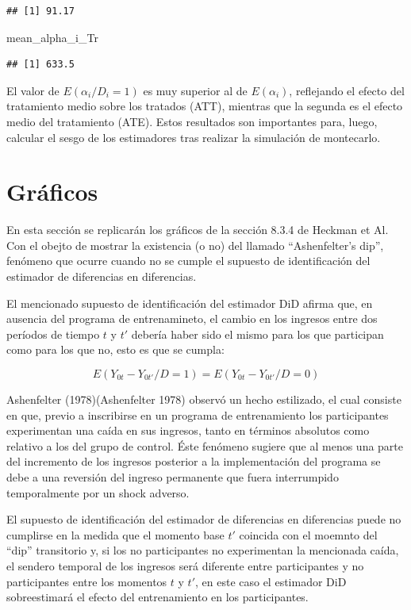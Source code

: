 \documentclass[]{article}
\newenvironment{Shaded}{\begin{snugshade}}{\end{snugshade}}
\newcommand{\NormalTok}[1]{{#1}}
\begin{document}
\begin{verbatim}
## [1] 91.17
\end{verbatim}

\begin{Shaded}
\begin{Highlighting}[]
\NormalTok{mean_alpha_i_Tr}
\end{Highlighting}
\end{Shaded}

\begin{verbatim}
## [1] 633.5
\end{verbatim}

El valor de $E(\alpha_{i}/D_{i}=1)$ es muy superior al de
$E(\alpha_{i})$, reflejando el efecto del tratamiento medio sobre los
tratados (ATT), mientras que la segunda es el efecto medio del
tratamiento (ATE). Estos resultados son importantes para, luego,
calcular el sesgo de los estimadores tras realizar la simulación de
montecarlo.

\section{Gráficos}\label{graficos}

En esta sección se replicarán los gráficos de la sección 8.3.4 de
Heckman et Al. Con el obejto de mostrar la existencia (o no) del llamado
``Ashenfelter's dip'', fenómeno que ocurre cuando no se cumple el
supuesto de identificación del estimador de diferencias en diferencias.

El mencionado supuesto de identificación del estimador DiD afirma que,
en ausencia del programa de entrenamineto, el cambio en los ingresos
entre dos períodos de tiempo $t$ y $t'$ debería haber sido el mismo para
los que participan como para los que no, esto es que se cumpla:

\[ E(Y_{0t}-Y_{0t'}/D=1)=E(Y_{0t}-Y_{0t'}/D=0) \]

Ashenfelter (1978)(Ashenfelter 1978) observó un hecho estilizado, el
cual consiste en que, previo a inscribirse en un programa de
entrenamiento los participantes experimentan una caída en sus ingresos,
tanto en términos absolutos como relativo a los del grupo de control.
Éste fenómeno sugiere que al menos una parte del incremento de los
ingresos posterior a la implementación del programa se debe a una
reversión del ingreso permanente que fuera interrumpido temporalmente
por un shock adverso.

El supuesto de identificación del estimador de diferencias en
diferencias puede no cumplirse en la medida que el momento base $t'$
coincida con el moemnto del ``dip'' transitorio y, si los no
participantes no experimentan la mencionada caída, el sendero temporal
de los ingresos será diferente entre participantes y no participantes
entre los momentos $t$ y $t'$, en este caso el estimador DiD
sobreestimará el efecto del entrenamiento en los participantes.
\end{document}
